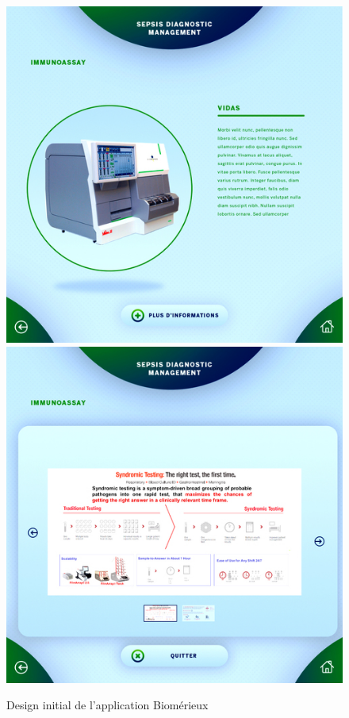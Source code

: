 \documentclass{article}
\begin{document}
\begin{figure}[h]
    \includegraphics[scale=0.195]{resized-bmx-3-initial.jpg}
    \includegraphics[scale=0.195]{resized-bmx-4-initial.jpg}
    \caption{Design initial de l'application Biomérieux}
\end{figure}
\end{document}
